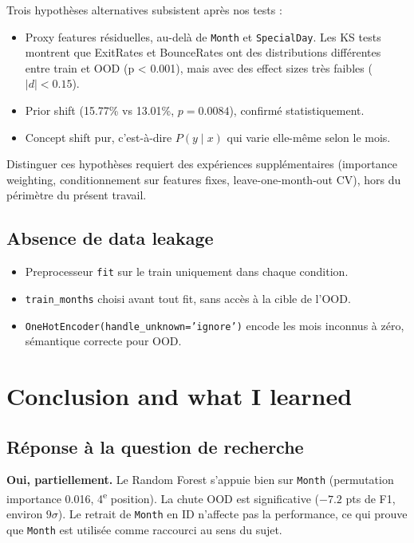 \documentclass[11pt,a4paper]{article}
\newcommand{\code}[1]{\texttt{\small#1}}
\begin{document}
Trois hypothèses alternatives subsistent après nos tests :

\begin{itemize}
\item Proxy features résiduelles, au-delà de \code{Month} et \code{SpecialDay}. Les KS tests montrent que ExitRates et BounceRates ont des distributions différentes entre train et OOD (p < 0.001), mais avec des effect sizes très faibles ($|d| < 0.15$).
\item Prior shift (15.77\% vs 13.01\%, $p = 0.0084$), confirmé statistiquement.
\item Concept shift pur, c'est-à-dire $P(y \mid x)$ qui varie elle-même selon le mois.
\end{itemize}

Distinguer ces hypothèses requiert des expériences supplémentaires (importance weighting, conditionnement sur features fixes, leave-one-month-out CV), hors du périmètre du présent travail.

\subsection*{Absence de data leakage}

\begin{itemize}
\item Preprocesseur \code{fit} sur le train uniquement dans chaque condition.
\item \code{train\_months} choisi avant tout fit, sans accès à la cible de l'OOD.
\item \code{OneHotEncoder(handle\_unknown='ignore')} encode les mois inconnus à zéro, sémantique correcte pour OOD.
\end{itemize}

\section{Conclusion and what I learned}

\subsection*{Réponse à la question de recherche}

\textbf{Oui, partiellement.} Le Random Forest s'appuie bien sur \code{Month} (permutation importance 0.016, 4\textsuperscript{e} position). La chute OOD est significative ($-7.2$ pts de F1, environ $9\sigma$). Le retrait de \code{Month} en ID n'affecte pas la performance, ce qui prouve que \code{Month} est utilisée comme raccourci au sens du sujet.
\end{document}
